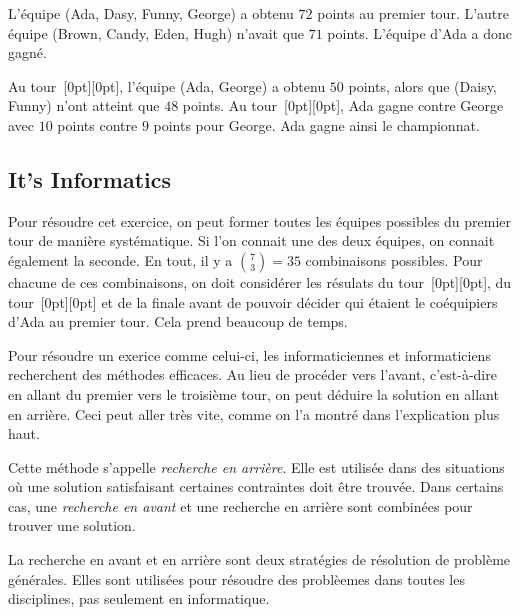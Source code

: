 \documentclass[a4paper,11pt]{report}
\newcommand{\taskGraphicsFolder}{..}
\begin{document}
L’équipe (Ada, Dasy, Funny, George) a obtenu $72$ points au premier tour. L’autre équipe (Brown, Candy, Eden, Hugh) n’avait que $71$ points. L’équipe d’Ada a donc gagné.

Au tour~\raisebox{-0.5ex}[0pt][0pt]{}, l’équipe (Ada, George) a obtenu $50$ points, alors que (Daisy, Funny) n’ont atteint que $48$ points. Au tour~\raisebox{-0.5ex}[0pt][0pt]{}, Ada gagne contre George avec $10$ points contre $9$ points pour George. Ada gagne ainsi le championnat.


\subsection*{It’s Informatics}

Pour résoudre cet exercice, on peut former toutes les équipes possibles du premier tour de manière systématique. Si l’on connait une des deux équipes, on connait également la seconde. En tout, il y a ${{7 \choose 3} = 35}$ combinaisons possibles. Pour chacune de ces combinaisons, on doit considérer les résulats du tour~\raisebox{-0.5ex}[0pt][0pt]{}, du tour~\raisebox{-0.5ex}[0pt][0pt]{} et de la finale avant de pouvoir décider qui étaient le coéquipiers d’Ada au premier tour. Cela prend beaucoup de temps.

Pour résoudre un exerice comme celui-ci, les informaticiennes et informaticiens recherchent des méthodes efficaces. Au lieu de procéder vers l’avant, c’est-à-dire en allant du premier vers le troisième tour, on peut déduire la solution en allant en arrière. Ceci peut aller très vite, comme on l’a montré dans l’explication plus haut.

Cette méthode s’appelle \emph{recherche en arrière}. Elle est utilisée dans des situations où une solution satisfaisant certaines contraintes doit être trouvée. Dans certains cas, une \emph{recherche en avant} et une recherche en arrière sont combinées pour trouver une solution.

La recherche en avant et en arrière sont deux stratégies de résolution de problème générales. Elles sont utilisées pour résoudre des problèemes dans toutes les disciplines, pas seulement en informatique.
\end{document}
